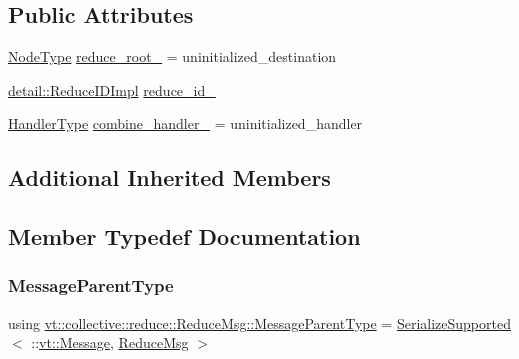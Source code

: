 \subsection*{Public Attributes}
\begin{DoxyCompactItemize}
\item 
\hyperlink{namespacevt_a866da9d0efc19c0a1ce79e9e492f47e2}{Node\+Type} \hyperlink{structvt_1_1collective_1_1reduce_1_1_reduce_msg_a976e38c6642d09d5f171aab8216df6b0}{reduce\+\_\+root\+\_\+} = uninitialized\+\_\+destination
\item 
\hyperlink{structvt_1_1collective_1_1reduce_1_1detail_1_1_reduce_i_d_impl}{detail\+::\+Reduce\+I\+D\+Impl} \hyperlink{structvt_1_1collective_1_1reduce_1_1_reduce_msg_a257abf9404c2c0cfa00625261b222540}{reduce\+\_\+id\+\_\+}
\item 
\hyperlink{namespacevt_af64846b57dfcaf104da3ef6967917573}{Handler\+Type} \hyperlink{structvt_1_1collective_1_1reduce_1_1_reduce_msg_a1265faa9b668a8668148a97f98b75d0d}{combine\+\_\+handler\+\_\+} = uninitialized\+\_\+handler
\end{DoxyCompactItemize}
\subsection*{Additional Inherited Members}


\subsection{Member Typedef Documentation}
\mbox{\label{structvt_1_1collective_1_1reduce_1_1_reduce_msg_a5c736b83ddd821bdce047715e0b606f2}} 
\subsubsection{\texorpdfstring{Message\+Parent\+Type}{MessageParentType}}
{\footnotesize\ttfamily using \hyperlink{structvt_1_1collective_1_1reduce_1_1_reduce_msg_a5c736b83ddd821bdce047715e0b606f2}{vt\+::collective\+::reduce\+::\+Reduce\+Msg\+::\+Message\+Parent\+Type} =  \hyperlink{namespacevt_a3862b8e3f67ab03f3a4313d828592fa9}{Serialize\+Supported}$<$ \+::\hyperlink{namespacevt_a3a3ddfef40b4c90915fa43cdd5f129ea}{vt\+::\+Message}, \hyperlink{structvt_1_1collective_1_1reduce_1_1_reduce_msg}{Reduce\+Msg} $>$}



